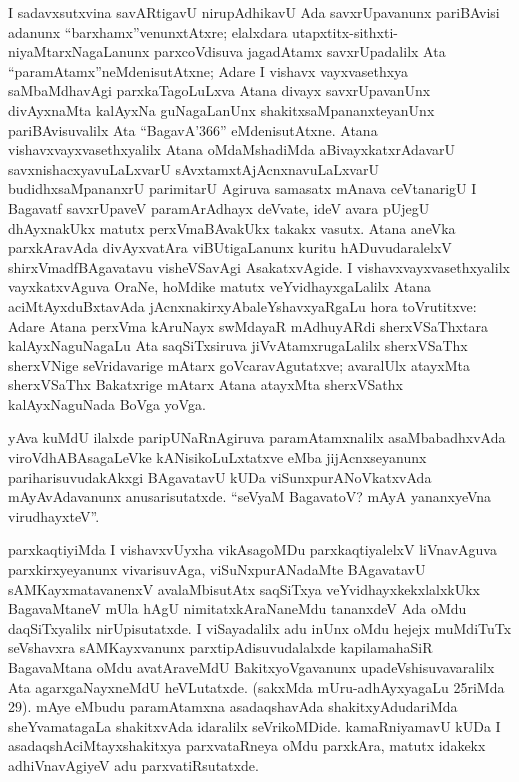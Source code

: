 I sadavxsutxvina savARtigavU nirupAdhikavU Ada savxrUpavanunx pariBAvisi adanunx ``barxhamx''venunxtAtxre; elalxdara utapxtitx-sithxti-niyaMtarxNagaLanunx parxcoVdisuva jagadAtamx savxrUpadalilx Ata ``paramAtamx''neMdenisutAtxne; Adare I vishavx vayxvasethxya saMbaMdhavAgi parxkaTagoLuLxva Atana divayx savxrUpavanUnx divAyxnaMta kalAyxNa guNagaLanUnx shakitxsaMpananxteyanUnx pariBAvisuvalilx Ata ``BagavA\char'366'' eMdenisutAtxne. Atana vishavxvayxvasethxyalilx Atana oMdaMshadiMda aBivayxkatxrAdavarU savxnishacxyavuLaLxvarU sAvxtamxtAjAcnxnavuLaLxvarU budidhxsaMpananxrU parimitarU Agiruva samasatx mAnava ceVtanarigU I Bagavatf savxrUpaveV paramArAdhayx deVvate, ideV avara pUjegU dhAyxnakUkx matutx perxVmaBAvakUkx takakx vasutx. Atana aneVka parxkAravAda divAyxvatAra viBUtigaLanunx kuritu hADuvudaralelxV shirxVmadfBAgavatavu visheVSavAgi AsakatxvAgide. I vishavxvayxvasethxyalilx vayxkatxvAguva OraNe, hoMdike matutx veYvidhayxgaLalilx Atana aciMtAyxduBxtavAda jAcnxnakirxyAbaleYshavxyaRgaLu hora toVrutitxve: Adare Atana perxVma kAruNayx swMdayaR mAdhuyARdi sherxVSaThxtara kalAyxNaguNagaLu Ata saqSiTxsiruva jiVvAtamxrugaLalilx sherxVSaThx sherxVNige seVridavarige mAtarx goVcaravAgutatxve; avaralUlx atayxMta sherxVSaThx Bakatxrige mAtarx Atana atayxMta sherxVSathx kalAyxNaguNada BoVga yoVga.

yAva kuMdU ilalxde paripUNaRnAgiruva paramAtamxnalilx asaMbabadhxvAda viroVdhABAsagaLeVke kANisikoLuLxtatxve eMba jijAcnxseyanunx pariharisuvudakAkxgi BAgavatavU kUDa viSunxpurANoVkatxvAda mAyAvAdavanunx anusarisutatxde. ``seVyaM BagavatoV? mAyA yananxyeVna virudhayxteV''.

parxkaqtiyiMda I vishavxvUyxha vikAsagoMDu parxkaqtiyalelxV liVnavAguva parxkirxye\break\-yanunx vivarisuvAga, viSuNxpurANadaMte BAgavatavU sAMKayxmatavanenxV avalaMbi\-sutAtx saqSiTxya veYvidhayxkekxlalxkUkx BagavaMtaneV mUla hAgU nimitatxkAraNaneMdu tananxdeV Ada oMdu daqSiTxyalilx nirUpisutatxde. I viSayadalilx adu inUnx oMdu hejejx muMdiTuTx seVshavxra sAMKayxvanunx parxtipAdisuvudalalxde kapilamahaSiR BagavaMtana oMdu avatAraveMdU BakitxyoVgavanunx upadeVshisuvavaralilx Ata agarxgaNayxneMdU heVLutatxde. (sakxMda mUru-adhAyxyagaLu 25riMda 29). mAye eMbudu paramAtamxna asadaqshavAda shakitxyAdudariMda sheYvamatagaLa shakitxvAda idaralilx seVrikoMDide. kamaRniyamavU kUDa I asadaqshAciMtayxshakitxya parxvataRneya oMdu parxkAra, matutx idakekx adhiVnavAgiyeV adu parxvatiRsutatxde.

